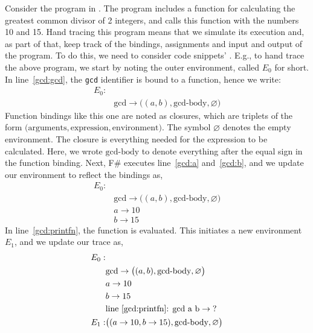 \documentclass[fsharpnotes.tex]{subfiles}
\begin{document}
Consider the program in . 
%
%
The program includes a function for calculating the greatest common divisor of 2 integers, and calls this function with the numbers 10 and 15. Hand tracing this program means that we simulate its execution and, as part of that, keep track of the bindings, assignments and input and output of the program. To do this, we need to consider code snippets' . E.g., to hand trace the above program, we start by noting the outer environment, called $E_0$ for short. In line~\ref{gcd:gcd}, the \lstinline!gcd! identifier is bound to a function, hence we write:
\begin{align*}
  E_0:&\\
  & \text{gcd} \rightarrow \big((a, b), \text{gcd-body}, \varnothing\big)
\end{align*}
Function bindings like this one are noted as closures, which are triplets of the form $\big(\text{arguments}, \text{expression}, \text{environment}\big)$. The symbol $\varnothing$ denotes the empty environment. The closure is everything needed for the expression to be calculated. Here, we wrote $\text{gcd-body}$ to denote everything after the equal sign in the function binding. Next, F\# executes line~\ref{gcd:a} and~\ref{gcd:b}, and we update our environment to reflect the bindings as, 
\begin{align*}
  E_0:&\\
  & \text{gcd} \rightarrow \big((a, b), \text{gcd-body}, \varnothing\big)\\
  & a \rightarrow 10\\
  & b \rightarrow 15
\end{align*}
In line~\ref{gcd:printfn}, the function is evaluated. This initiates a new environment $E_1$, and we update our trace as,
\begin{align*}
  E_0:&\\
      & \text{gcd} \rightarrow \big((a, b), \text{gcd-body}, \varnothing\big)\\
      & a \rightarrow 10\\
      & b \rightarrow 15\\
      & \text{line~\ref{gcd:printfn}: gcd a b} \rightarrow \text{?}\\
  E_1:& \big((a \rightarrow 10, b \rightarrow 15), \text{gcd-body}, \varnothing\big)\\
\end{align*}
\end{document}
